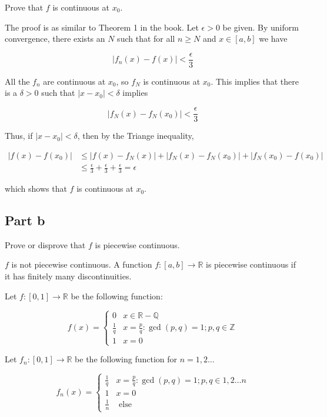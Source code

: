 \documentclass{article}
\newcommand{\R}{\mathbb{R}}
\newcommand{\Q}{\mathbb{Q}}
\newcommand{\Z}{\mathbb{Z}}
\begin{document}
Prove that $f$ is continuous at $x_0$.

The proof is as similar to Theorem 1 in the book. Let $\epsilon > 0$ be given. By uniform convergence, there exists an $N$ such that for all $n \geq N$ and $x \in [a, b]$ we have

\[
|f_n(x) - f(x)| < \frac{\epsilon}{3}
\]

All the $f_n$ are continuous at $x_0$, so $f_N$ is continuous at $x_0$. This implies that there is a $\delta > 0$ such that $|x-x_0| < \delta$ implies

\[
|f_N(x) - f_N(x_0)| < \frac{\epsilon}{3}
\]

Thus, if $|x - x_0| < \delta$, then by the Triange inequality,

\begin{align*}
|f(x) - f(x_0)| &\leq |f(x) - f_N(x)| + |f_N(x) - f_N(x_0)| + |f_N(x_0) - f(x_0)| \\
&\leq \frac{\epsilon}{3} + \frac{\epsilon}{3} +\frac{\epsilon}{3} = \epsilon
\end{align*}

which shows that $f$ is continuous at $x_0$.

\subsection*{Part b}

Prove or disprove that $f$ is piecewise continuous.

$f$ is not piecewise continuous. A function $f: [a, b] \rightarrow \R$ is piecewise continuous if it has finitely many discontinuities.

Let $f: [0, 1] \rightarrow \R$ be the following function:

\[
f(x) = 
\begin{cases}
0 & x \in \R - \Q \\
\frac{1}{q} & x = \frac{p}{q}: \gcd(p, q) = 1; p, q \in \Z \\
1 & x = 0
\end{cases}
\]

Let $f_n: [0, 1] \rightarrow \R$ be the following function for $n = 1, 2 \dots$

\[
f_n(x) = 
\begin{cases}
\frac{1}{q} & x = \frac{p}{q}: \gcd(p, q) = 1; p, q \in 1, 2 \dots n \\
1 & x = 0 \\
\frac{1}{n} & \text{ else}
\end{cases}
\]
\end{document}
